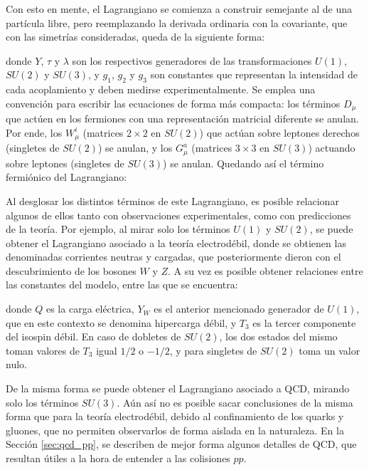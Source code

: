 Con esto en mente, el Lagrangiano se comienza a construir semejante al de una partícula libre, pero reemplazando la derivada ordinaria con la covariante, que con las simetrías consideradas, queda de la siguiente forma:


donde $Y$, $\tau$ y $\lambda$ son los respectivos generadores de las transformaciones $U(1)$, $SU(2)$ y $SU(3)$, y $g_1$, $g_2$ y $g_3$ son constantes que representan la intensidad de cada acoplamiento y deben medirse experimentalmente. Se emplea una convención para escribir las ecuaciones de forma más compacta: los términos $D_{\mu}$ que actúen en los fermiones con una representación matricial diferente se anulan. Por ende, los $W_{\mu}^{i}$ (matrices $2\times2$ en $SU(2)$) que actúan sobre leptones derechos (singletes de $SU(2)$) se anulan, y los $G_{\mu}^{a}$ (matrices $3\times3$ en $SU(3)$) actuando sobre leptones (singletes de $SU(3)$) se anulan. Quedando así el término fermiónico del Lagrangiano:


Al desglosar los distintos términos de este Lagrangiano, es posible relacionar algunos de ellos tanto con observaciones experimentales, como con predicciones de la teoría. Por ejemplo, al mirar solo los términos $U(1)$ y $SU(2)$, se puede obtener el Lagrangiano asociado a la teoría electrodébil, donde se obtienen las denominadas corrientes neutras y cargadas, que posteriormente dieron con el descubrimiento de los bosones $W$ y $Z$. A su vez es posible obtener relaciones entre las constantes del modelo, entre las que se encuentra:





donde $Q$ es la carga eléctrica, $Y_W$ es el anterior mencionado generador de $U(1)$, que en este contexto se denomina hipercarga débil, y $T_3$ es la tercer componente del isospin débil. En caso de dobletes de $SU(2)$, los dos estados del mismo toman valores de $T_3$ igual $1/2$ o $-1/2$, y para singletes de $SU(2)$ toma un valor nulo.

De la misma forma se puede obtener el Lagrangiano asociado a QCD, mirando solo los términos $SU(3)$. Aún así no es posible sacar conclusiones de la misma forma que para la teoría electrodébil, debido al confinamiento de los quarks y gluones, que no permiten observarlos de forma aislada en la naturaleza. En la Sección \ref{sec:qcd_pp}, se describen de mejor forma algunos detalles de QCD, que resultan útiles a la hora de entender a las colisiones $pp$.

